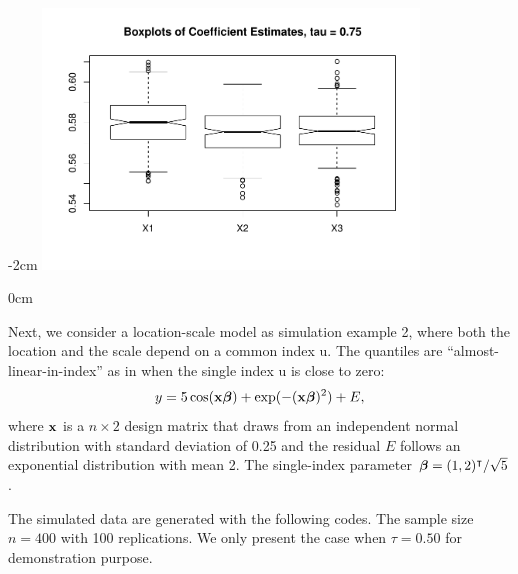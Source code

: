 \begin{Schunk}
\centering
\addtolength{\leftskip} {-2cm}
\addtolength{\rightskip}{-2cm}
\includegraphics[width=10cm]{siqr_files/figure-latex/unnamed-chunk-9-1} 

\end{Schunk}

\addtolength{\leftskip} {0cm}
\addtolength{\rightskip}{0cm}

Next, we consider a location-scale model as simulation example 2, where both the location and the scale depend on a common index u. The quantiles are ``almost-linear-in-index'' as in \cite{yu_local_1998} when the single index u is close to zero:
\begin{equation} \label{eq:sim2}
  y=5 \cos ({\bf x}\mbox{\boldmath$\beta$})+ \exp(-({\bf x}\mbox{\boldmath$\beta$})^2) + E, 
\end{equation}
where ${\bf x}$ is a $n\times2$ design matrix that draws from an independent normal distribution with standard deviation of 0.25 and the residual $E$ follows an exponential distribution with mean 2. The single-index parameter $\mbox{\boldmath$\beta$} = (1,2)^{\intercal} / \sqrt{5}$. 

The simulated data are generated with the following codes. The sample size $n = 400$ with 100 replications. We only present the case when $\tau = 0.50$ for demonstration purpose. 


